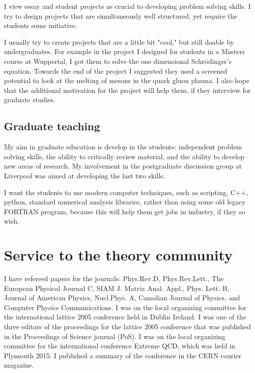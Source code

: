 \documentclass[12pt]{article}
\begin{document}
I view essay and student projects as crucial to developing
problem solving skills. I try to design projects
that are simultaneously well structured, yet require
the students some initiative.

I usually try to create projects
that are a little bit "cool," but still doable by undergraduates.
For example in the project I designed for students
in a Masters course at Wuppertal, I got them to solve
the one dimensional Schr\"{o}dinger's equation. Towards the end
of the project I suggested they used a screened potential
to look at the melting of mesons in the quark gluon
plasma. I also hope that the additional motivation for the
project will help them,
if they interview for graduate studies.

\subsection{Graduate teaching}

My aim in graduate education is develop in the students:
independent problem solving skills, 
the ability to critically review material, and 
the ability to develop new areas of research. My 
involvement in the postgraduate discussion group at Liverpool
was aimed at developing the last two skills.

I want the students to use modern computer
techniques, such as scripting, C++, python, standard numerical
analysis libraries, rather than using some old legacy
FORTRAN program, because this will help them 
get jobs in industry, if they so wish.



\section{Service to the theory community}

I have refereed papers for the journals: Phys.Rev.D, Phys.Rev.Lett.,
The European Physical Journal C, SIAM J. Matrix Anal. Appl.,
Phys. Lett. B, Journal of American Physics, Nucl.Phys. A, 
Canadian Journal of Physics,
and 
Computer Physics Communications.
I was on the local
organizing committee for the international lattice 2005 conference
held in Dublin Ireland. I was one of the three editors of the
proceedings for the lattice 2005 conference that was published in the
Proceedings of Science journal (PoS). I was on the local organizing
committee for the international conference Extreme QCD, which was held
in Plymouth 2015. I published a summary of the conference in the CERN 
courier magazine.
\end{document}
